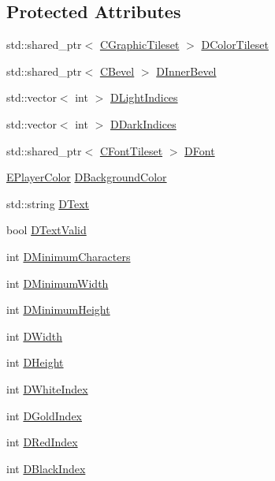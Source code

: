 \subsection*{Protected Attributes}
\begin{DoxyCompactItemize}
\item 
std\+::shared\+\_\+ptr$<$ \hyperlink{classCGraphicTileset}{C\+Graphic\+Tileset} $>$ \hyperlink{classCEditRenderer_a43dfa83f85527019c7499e33ecaed149}{D\+Color\+Tileset}
\item 
std\+::shared\+\_\+ptr$<$ \hyperlink{classCBevel}{C\+Bevel} $>$ \hyperlink{classCEditRenderer_a45b1bf4e9aebe3811c15df1018b8d8da}{D\+Inner\+Bevel}
\item 
std\+::vector$<$ int $>$ \hyperlink{classCEditRenderer_aa1d5d41e26d759abd3ff5ba8edc4d692}{D\+Light\+Indices}
\item 
std\+::vector$<$ int $>$ \hyperlink{classCEditRenderer_a6bbd6668cec64e318d5e814423bac3ca}{D\+Dark\+Indices}
\item 
std\+::shared\+\_\+ptr$<$ \hyperlink{classCFontTileset}{C\+Font\+Tileset} $>$ \hyperlink{classCEditRenderer_afd108ae6cb3e9eeffce881a1ada0f0db}{D\+Font}
\item 
\hyperlink{GameDataTypes_8h_aafb0ca75933357ff28a6d7efbdd7602f}{E\+Player\+Color} \hyperlink{classCEditRenderer_a7e5e1b18db4c53fe288c200aed673ccf}{D\+Background\+Color}
\item 
std\+::string \hyperlink{classCEditRenderer_af79bf047383c610d4fc24d937e29c594}{D\+Text}
\item 
bool \hyperlink{classCEditRenderer_ab4f0c6b356170adad1ad3b3e16573966}{D\+Text\+Valid}
\item 
int \hyperlink{classCEditRenderer_ae5d0bd249b2d483c361b0bf9c16c15d3}{D\+Minimum\+Characters}
\item 
int \hyperlink{classCEditRenderer_aba068f1e6d267e5ac0ed5752304133e8}{D\+Minimum\+Width}
\item 
int \hyperlink{classCEditRenderer_a9e063123747e147ef1c35bd962205fbd}{D\+Minimum\+Height}
\item 
int \hyperlink{classCEditRenderer_ab203e5083f61d3575eb491f170c21d45}{D\+Width}
\item 
int \hyperlink{classCEditRenderer_ade8dedb4f9790d28b38da8ef20a171cb}{D\+Height}
\item 
int \hyperlink{classCEditRenderer_aaa97fde55438f6ad02cbb365097a2274}{D\+White\+Index}
\item 
int \hyperlink{classCEditRenderer_adef6e0cd1cc67b18a196bbac95a7306b}{D\+Gold\+Index}
\item 
int \hyperlink{classCEditRenderer_a77ce4df48e03a8b9245f2045c2c3c4e7}{D\+Red\+Index}
\item 
int \hyperlink{classCEditRenderer_a13b03f02ff6673d8df2d6509c17bcccc}{D\+Black\+Index}
\end{DoxyCompactItemize}


